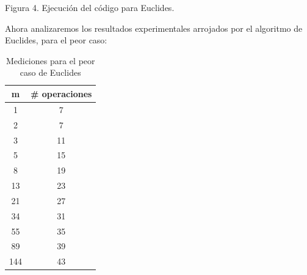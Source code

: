 \documentclass[12pt,twoside]{article}
\begin{document}
    \vspace{-1cm}
    \begin{center}
        Figura 4. Ejecuci\'on del c\'odigo para Euclides.
    \end{center}
    \medskip
Ahora analizaremos los resultados experimentales arrojados por el algoritmo de Euclides, para el peor caso:
\begin{table}[htbp]
    \begin{center}
        \begin{tabular}{|c|c|}
            \hline
            \textbf{m} & \textbf{\# operaciones} \\
            \hline \hline
            1 &	7 \\ \hline
            2 &	7 \\ \hline
            3 &	11 \\ \hline
            5 &	15 \\ \hline
            8 &	19 \\ \hline
            13 &	23 \\ \hline
            21 & 27 \\ \hline
            34 & 31 \\ \hline
            55 & 35 \\ \hline
            89 & 39 \\ \hline
            144 & 43 \\ \hline
        \end{tabular}
        \caption{Mediciones para el peor caso de Euclides}
        \label{tabla:analisis4}
    \end{center}
\end{table}
\end{document}
